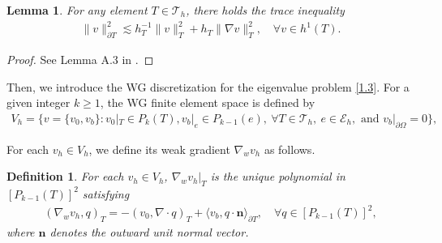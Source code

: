 \documentclass[compress, preprint,9pt]{elsarticle}
\numberwithin{equation}{section}
\newtheorem{lemma}{Lemma}[section]
\newtheorem{defi}{Definition}[section]
\newcommand{\E}{\mathcal{E}}
\newcommand{\T}{{\mathcal{T}}}
\newcommand{\bn}{\mathbf{n}}
\newcommand{\la}{\langle}
\newcommand{\ra}{\rangle_{\partial T}}
\begin{document}
\begin{lemma}
	For any element  $T\in\T_h$, there holds the trace inequality
	\begin{eqnarray}\label{trace}
		\|v\|_{\partial T}^2\lesssim h_T^{-1}\|v\|_T^2+h_T\|\nabla v\|_T^2,\quad\forall v\in h^1(T).
	\end{eqnarray}
\end{lemma}
\begin{proof}
	See Lemma A.3 in \cite{Wang2014a}.
\end{proof}


Then, we introduce the WG discretization for the eigenvalue problem \eqref{1.3}. For a given integer $k\ge1$, the WG finite element space is defined by
\begin{eqnarray*}
	V_h= \big\{ v=\{ v_0, v_b\}: v_0|_T\in  P_k(T),  v_b|_e\in  P_{k-1}(e),\ \forall T\in\T_h,\ e\in\E_h,\text{ and }  v_b|_{\partial\Omega}= 0\big\},
\end{eqnarray*}

	
	For each $ v_h\in V_h$, we define its weak gradient $\nabla_w v_h$ as follows.
	\begin{defi}
		For each $ v_h\in V_h$, $\nabla_w v_h|_T$ is the unique polynomial in $[P_{k-1}(T)]^{2}$
		satisfying
		\begin{eqnarray*}
			(\nabla_w v_h,q)_T=-(v_0,\nabla\cdot q)_T+\la v_b,q\cdot\bn
			\ra,\quad\forall q\in [P_{k-1}(T)]^2,
		\end{eqnarray*}
		where $\bn$ denotes the outward unit normal vector.
	\end{defi}
	
\end{document}
